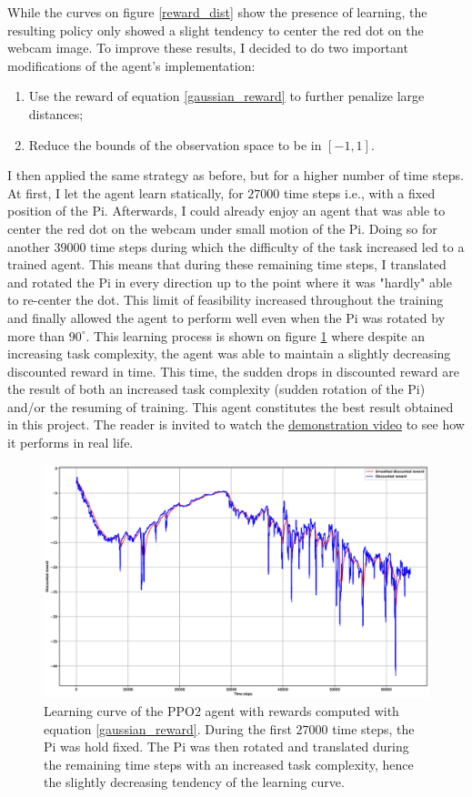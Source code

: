 While the curves on figure \ref{reward_dist} show the presence of learning, the resulting policy only showed a slight tendency to center the red dot on the webcam image. To improve these results, I decided to do two important modifications of the agent's implementation:

\begin{enumerate}
	\item Use the reward of equation \ref{gaussian_reward} to further penalize large distances;
	\item Reduce the bounds of the observation space to be in $[-1, 1]$.
\end{enumerate}

I then applied the same strategy as before, but for a higher number of time steps. At first, I let the agent learn statically, for $27000$ time steps i.e., with a fixed position of the Pi. Afterwards, I could already enjoy an agent that was able to center the red dot on the webcam under small motion of the Pi. Doing so for another $39000$ time steps during which the difficulty of the task increased led to a trained agent. This means that during these remaining time steps, I translated and rotated the Pi in every direction up to the point where it was "hardly" able to re-center the dot. This limit of feasibility increased throughout the training and finally allowed the agent to perform well even when the Pi was rotated by more than $90^{\circ}$. This learning process is shown on figure \ref{reward_dist2} where despite an increasing task complexity, the agent was able to maintain a slightly decreasing discounted reward in time. This time, the sudden drops in discounted reward are the result of both an increased task complexity (sudden rotation of the Pi) and/or the resuming of training. This agent constitutes the best result obtained in this project. The reader is invited to watch the \href{https://youtu.be/VGtoMPvjIwM}{demonstration video} to see how it performs in real life.

\begin{figure}[H]
	\centering
	\includegraphics[scale=0.2]{Images/ppo2_2.eps}
	\caption{Learning curve of the PPO2 agent with rewards computed with equation \ref{gaussian_reward}. During the first $27000$ time steps, the Pi was hold fixed. The Pi was then rotated and translated during the remaining time steps with an increased task complexity, hence the slightly decreasing tendency of the learning curve.}
	\label{reward_dist2}
\end{figure}

